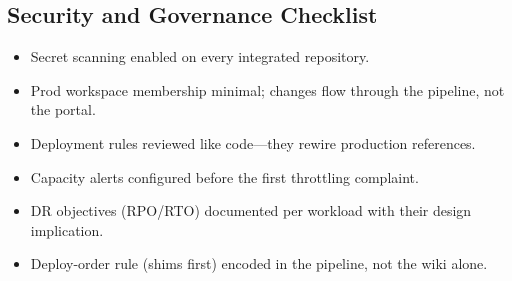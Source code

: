 \subsection{Security and Governance Checklist}
\begin{itemize}
    \item Secret scanning enabled on every integrated repository.
    \item Prod workspace membership minimal; changes flow through the pipeline, not the portal.
    \item Deployment rules reviewed like code---they rewire production references.
    \item Capacity alerts configured before the first throttling complaint.
    \item DR objectives (RPO/RTO) documented per workload with their design implication.
    \item Deploy-order rule (shims first) encoded in the pipeline, not the wiki alone.
\end{itemize}

